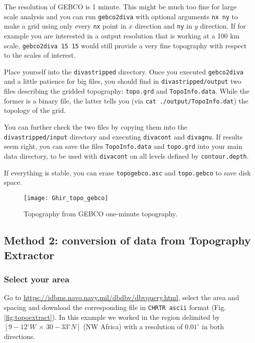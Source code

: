 The resolution of GEBCO is 1 minute. This might be much too fine for large scale analysis and you can run
{\tt gebco2diva} with optional arguments {\tt nx ny} to make a grid using only every {\tt nx} point in $x$ direction and {\tt ny} in $y$ direction. If for example you are interested in a \diva output resolution that is working at a 100 km scale, {\tt gebco2diva 15 15} would still provide a very fine topography with respect to the scales of interest.

Place yourself into the {\tt divastripped} directory. Once you executed {\tt gebco2diva} and a little patience for big files, you should find in {\tt divastripped/output} two files describing the gridded topography: {\tt topo.grd} and {\tt TopoInfo.data}. While the former is a binary file, the latter tells you (via {\tt cat ./output/TopoInfo.dat}) the topology of the grid.


You can further check the two files by copying them into the {\tt divastripped/input} directory and executing {\tt divacont} and {\tt divagnu}. If results seem right, you can save the files {\tt TopoInfo.data} and {\tt topo.grd} into your main data directory, to be used with {\tt divacont} on all levels defined by {\tt contour.depth}.

If everything is stable, you can erase {\tt topogebco.asc} and {\tt topo.gebco} to save disk space. 


\begin{figure}[htpb]
\centering
\texttt{[image: Ghir\_topo\_gebco]}
\caption{Topography from GEBCO one-minute topography.\label{fig:topoGebco3}}
\end{figure}

\subsection{Method 2: conversion of data from Topography Extractor\label{sec:toponavy}}

\subsubsection{Select your area}

Go to \url{https://idbms.navo.navy.mil/dbdbv/dbvquery.html}, select the area and spacing and download the corresponding file in \texttt{CHRTR ascii} format (Fig. \ref{fig:topoextract}). In this example we worked in the region delimited by $[9-12^{\circ}W\, \times\, 30-33^{\circ}N]$ (NW Africa) with a resolution of $0.01^{\circ}$ in both directions. 


